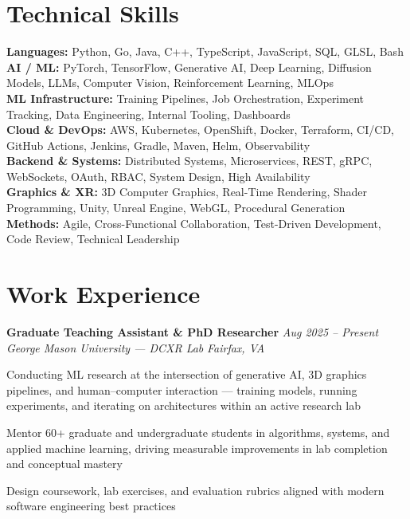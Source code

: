 \documentclass[letterpaper,10pt]{article}
\newcommand{\role}[4]{%
  \textbf{#1} \hfill \textit{#3}\\[-1pt]
  \textit{#2} \hfill \textit{#4}\par\vspace{2pt}
}
\begin{document}
\section*{Technical Skills}
\textbf{Languages:} Python, Go, Java, C++, TypeScript, JavaScript, SQL, GLSL, Bash\\
\textbf{AI / ML:} PyTorch, TensorFlow, Generative AI, Deep Learning, Diffusion Models, LLMs, Computer Vision, Reinforcement Learning, MLOps\\
\textbf{ML Infrastructure:} Training Pipelines, Job Orchestration, Experiment Tracking, Data Engineering, Internal Tooling, Dashboards\\
\textbf{Cloud \& DevOps:} AWS, Kubernetes, OpenShift, Docker, Terraform, CI/CD, GitHub Actions, Jenkins, Gradle, Maven, Helm, Observability\\
\textbf{Backend \& Systems:} Distributed Systems, Microservices, REST, gRPC, WebSockets, OAuth, RBAC, System Design, High Availability\\
\textbf{Graphics \& XR:} 3D Computer Graphics, Real-Time Rendering, Shader Programming, Unity, Unreal Engine, WebGL, Procedural Generation\\
\textbf{Methods:} Agile, Cross-Functional Collaboration, Test-Driven Development, Code Review, Technical Leadership

\section*{Work Experience}
\role{Graduate Teaching Assistant \& PhD Researcher}{George Mason University --- DCXR Lab}{Aug 2025 -- Present}{Fairfax, VA}
\begin{tightitemize}
  \item Conducting ML research at the intersection of generative AI, 3D graphics pipelines, and human--computer interaction --- training models, running experiments, and iterating on architectures within an active research lab
  \item Mentor 60+ graduate and undergraduate students in algorithms, systems, and applied machine learning, driving measurable improvements in lab completion and conceptual mastery
  \item Design coursework, lab exercises, and evaluation rubrics aligned with modern software engineering best practices
\end{tightitemize}
\end{document}
